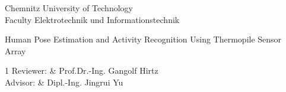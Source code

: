 \begin{tuctitlepage}
\begin{tuctitleorgunit}
Chemnitz University of Technology \\
Faculty Elektrotechnik und Informationstechnik\\
\end{tuctitleorgunit}

\tuctitlelogo

\bigskip
{}
\bigskip
{}

\vspace*{0pt plus 2fill}
\begin{tuctitletopic}
Human Pose Estimation and Activity Recognition Using Thermopile Sensor Array
\end{tuctitletopic}
\vspace*{0pt plus 2fill}

\begin{tuctitletable}[\bfseries]{1}
Reviewer: & Prof.Dr.-Ing. Gangolf Hirtz \\
Advisor:  & Dipl.-Ing. Jingrui Yu \\

\end{tuctitletable}

\vspace*{0pt plus 1fill}

\end{tuctitlepage}

